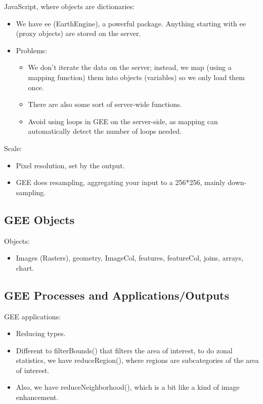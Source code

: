 \documentclass[
  letterpaper,
  DIV=11,
  numbers=noendperiod]{scrreprt}
\providecommand{\tightlist}{%
  \setlength{\itemsep}{0pt}\setlength{\parskip}{0pt}}\usepackage{longtable,booktabs,array}
\begin{document}
JavaScript, where objects are dictionaries:

\begin{itemize}
\tightlist
\item
  We have ee (EarthEngine), a powerful package. Anything starting with
  ee (proxy objects) are stored on the server.
\item
  Problems:

  \begin{itemize}
  \tightlist
  \item
    We don't iterate the data on the server; instead, we map (using a
    mapping function) them into objects (variables) so we only load them
    once.
  \item
    There are also some sort of server-wide functions.
  \item
    Avoid using loops in GEE on the server-side, as mapping can
    automatically detect the number of loops needed.
  \end{itemize}
\end{itemize}

Scale:

\begin{itemize}
\tightlist
\item
  Pixel resolution, set by the output.
\item
  GEE does resampling, aggregating your input to a 256*256, mainly
  down-sampling.
\end{itemize}

\hypertarget{gee-objects}{%
\subsection{GEE Objects}\label{gee-objects}}

Objects:

\begin{itemize}
\tightlist
\item
  Images (Rasters), geometry, ImageCol, features, featureCol, joins,
  arrays, chart.
\end{itemize}

\hypertarget{gee-processes-and-applicationsoutputs}{%
\subsection{GEE Processes and
Applications/Outputs}\label{gee-processes-and-applicationsoutputs}}

GEE applications:

\begin{itemize}
\tightlist
\item
  Reducing types.
\item
  Different to filterBounds() that filters the area of interest, to do
  zonal statistics, we have reduceRegion(), where regions are
  subcategories of the area of interest.
\item
  Also, we have reduceNeighborhood(), which is a bit like a kind of
  image enhancement.
\end{itemize}
\end{document}
